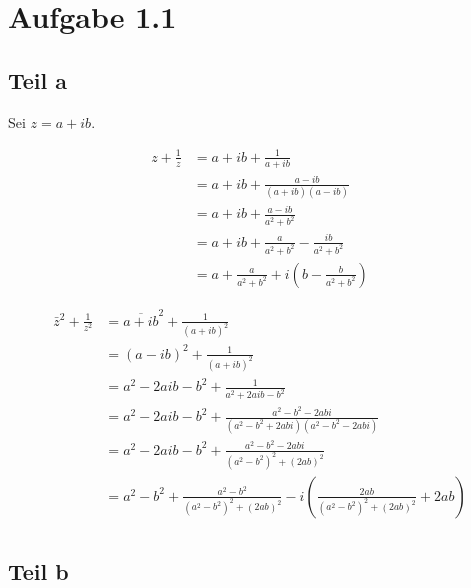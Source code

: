 \documentclass[10pt,a4paper]{article}
\begin{document}
\section{Aufgabe 1.1}

\subsection{Teil a}

Sei $z = a + ib$.

\begin{align*}
  z + \frac{1}{z} & = a + ib + \frac{1}{a + ib}\\
                  & = a + ib + \frac{a - ib}{(a + ib)(a - ib)}\\
                  & = a + ib + \frac{a - ib}{a^{2} + b^{2}}\\
                  & = a + ib + \frac{a}{a^{2} + b^{2}} - \frac{ib}{a^{2} + b^{2}}\\
                  & = a + \frac{a}{a^{2} + b^{2}} + i \left( b - \frac{b}{a^{2} + b^{2}} \right)
\end{align*}

\begin{align*}
  \bar{z}^{2} + \frac{1}{z^{2}} & = \overline{a + ib}^{2} + \frac{1}{(a + ib)^{2}}\\
                                & = (a - ib)^{2} + \frac{1}{(a + ib)^{2}}\\
                                & = a^{2} - 2aib - b^{2} + \frac{1}{a^{2} + 2aib - b^{2}}\\
                                & = a^{2} - 2aib - b^{2} + \frac{a^{2} - b^{2} - 2abi}{(a^{2} - b^{2} + 2abi)(a^{2} - b^{2} - 2abi)}\\
                                & = a^{2} - 2aib - b^{2} + \frac{a^{2} - b^{2} - 2abi}{(a^{2} - b^{2})^{2} + (2ab)^{2}}\\
                                & = a^{2} - b^{2} + \frac{a^{2} - b^{2}}{(a^{2} - b^{2})^{2} + (2ab)^{2}} - i \left( \frac{2ab}{(a^{2} - b^{2})^{2} + (2ab)^{2}} + 2ab \right)\\
\end{align*}

\subsection{Teil b}
\end{document}
